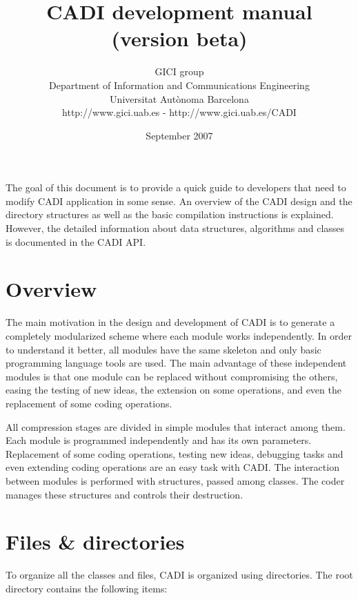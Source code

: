 \documentclass[a4paper,10pt]{article}
\title{CADI development manual \\ \small (version beta)}
\author{
GICI group \vspace{0.1cm} \\
\small Department of Information and Communications Engineering \\
\small Universitat Aut{\`o}noma Barcelona \\
\small http://www.gici.uab.es  -  http://www.gici.uab.es/CADI \\
}
\date{September 2007}
\begin{document}
\maketitle

	The goal of this document is to provide a quick guide to developers
	that need to modify CADI application in some sense. An overview of
	the CADI design and the directory structures as well as the basic
	compilation instructions is explained. However, the detailed
	information about data structures, algorithms and classes is
	documented in the CADI API. 

\section{Overview}
\label{sect:overview}

	The main motivation in the design and development of CADI is to
	generate a completely modularized scheme where each module works
	independently. In order to understand it better, all modules have
	the same skeleton and only basic programming language tools are
	used. The main advantage of these independent modules is that one
	module can be replaced without compromising the others, easing the
	testing of new ideas, the extension on some operations, and even
	the replacement of some coding operations. 

	All compression stages are divided in simple modules that interact
	among them. Each module is programmed independently and has its own
	parameters. Replacement of some coding operations, testing new
	ideas, debugging tasks and even extending coding operations are an
	easy task with CADI. The interaction between modules is performed
	with structures, passed among classes. The coder manages these
	structures and controls their destruction. 


\section{Files \& directories}
\label{sect:files}

	To organize all the classes and files, CADI is organized using 
	directories. The root directory contains the following items: 
\end{document}

